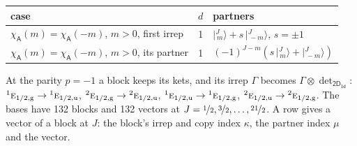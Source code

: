 \documentclass[10pt,a4paper]{article}
\numberwithin{equation}{section}
\newcommand{\grp}[1]{\mathsf{#1}}
\newcommand{\irr}[1]{\text{\normalfont\scshape #1}}
\newcommand{\conjpair}[1]{{}^{#1}}
\newcommand{\ptag}[1]{\mathrm{#1}}
\newcommand{\chiA}{\chi_{\grp{A}}}
\newcommand{\irrprod}{\otimes}
\newcommand{\mult}{\kappa}
\newcommand{\intx}{\mu}
\newcommand{\jm}[2]{\bigl\lvert{}^{#1}_{\,#2}\bigr\rangle}
\begin{document}
\begin{center}\begin{tabular}{@{}lrl@{}}\toprule
case & $d$ & partners\\\midrule
$\chiA(m) = \chiA(-m)$, $m > 0$, first irrep & 1 & $\jm{J}{m} + s\,\jm{J}{-m}$, $s = \pm1$\\
$\chiA(m) = \chiA(-m)$, $m > 0$, its partner & 1 & $(-1)^{J-m}(s\,\jm{J}{m} + \jm{J}{-m})$\\
\bottomrule\end{tabular}\end{center}
At the parity $p = -1$ a block keeps its kets, and its irrep $\Gamma$ becomes $\Gamma \irrprod \det_{\grp{2D_{1d}}}$: $\conjpair{1}\irr{e}_{1/2,\ptag{g}} \to \conjpair{1}\irr{e}_{1/2,\ptag{u}}$, $\conjpair{2}\irr{e}_{1/2,\ptag{g}} \to \conjpair{2}\irr{e}_{1/2,\ptag{u}}$, $\conjpair{1}\irr{e}_{1/2,\ptag{u}} \to \conjpair{1}\irr{e}_{1/2,\ptag{g}}$, $\conjpair{2}\irr{e}_{1/2,\ptag{u}} \to \conjpair{2}\irr{e}_{1/2,\ptag{g}}$.
The bases have 132 blocks and 132 vectors at $J = \nicefrac{1}{2}, \nicefrac{3}{2}, \dots, \nicefrac{21}{2}$. \label{n:index.copy}\label{n:head.vector}A row gives a vector of a block at $J$: the block's irrep and copy index $\mult$, the partner index $\intx$ and the vector.
\end{document}
